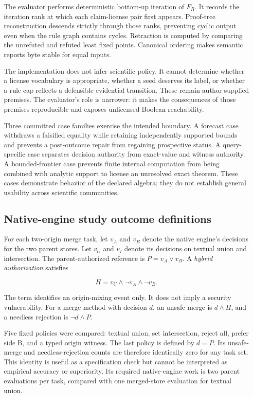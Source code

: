 \documentclass[pdflatex,sn-mathphys-num]{sn-jnl}
\begin{document}
The evaluator performs deterministic bottom-up iteration of \(F_R\). It records the iteration rank at which each claim-license pair first appears. Proof-tree reconstruction descends strictly through those ranks, preventing cyclic output even when the rule graph contains cycles. Retraction is computed by comparing the unrefuted and refuted least fixed points. Canonical ordering makes semantic reports byte stable for equal inputs.

The implementation does not infer scientific policy. It cannot determine whether a license vocabulary is appropriate, whether a seed deserves its label, or whether a rule cap reflects a defensible evidential transition. These remain author-supplied premises. The evaluator's role is narrower: it makes the consequences of those premises reproducible and exposes unlicensed Boolean reachability.

Three committed case families exercise the intended boundary. A forecast case withdraws a falsified equality while retaining independently supported bounds and prevents a post-outcome repair from regaining prospective status. A query-specific case separates decision authority from exact-value and witness authority. A bounded-frontier case prevents finite internal computation from being combined with analytic support to license an unresolved exact theorem. These cases demonstrate behavior of the declared algebra; they do not establish general usability across scientific communities.

\subsection{Native-engine study outcome definitions}\label{native-engine-study-outcome-definitions}

For each two-origin merge task, let \(v_A\) and \(v_B\) denote the native engine's decisions for the two parent stores. Let \(v_U\) and \(v_I\) denote its decisions on textual union and intersection. The parent-authorized reference is \(P=v_A\lor v_B\). A \emph{hybrid authorization} satisfies

\[
H=v_U\land\neg v_A\land\neg v_B.
\]

The term identifies an origin-mixing event only. It does not imply a security vulnerability. For a merge method with decision \(d\), an unsafe merge is \(d\land H\), and a needless rejection is \(\neg d\land P\).

Five fixed policies were compared: textual union, set intersection, reject all, prefer side B, and a typed origin witness. The last policy is defined by \(d=P\). Its unsafe-merge and needless-rejection counts are therefore identically zero for any task set. This identity is useful as a specification check but cannot be interpreted as empirical accuracy or superiority. Its required native-engine work is two parent evaluations per task, compared with one merged-store evaluation for textual union.
\end{document}
